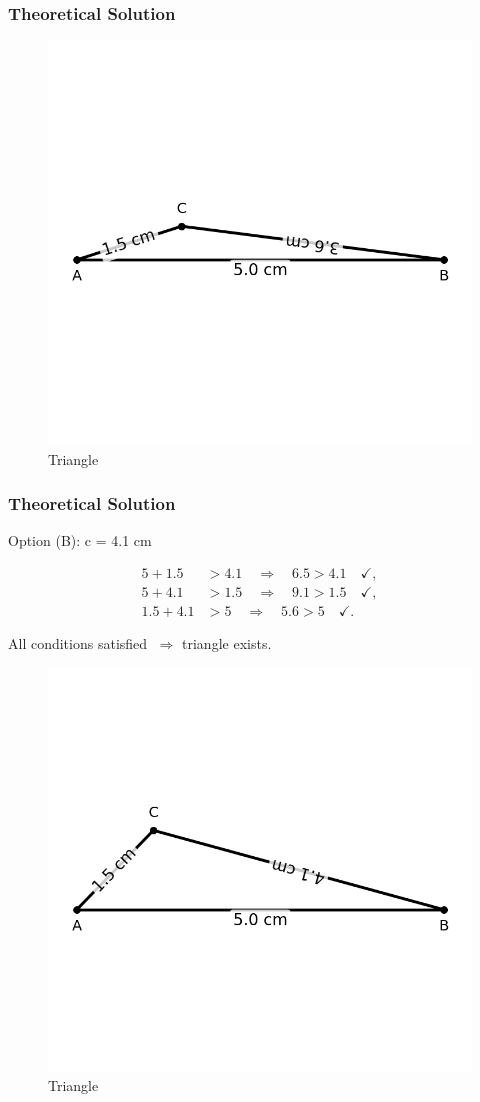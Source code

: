 \documentclass{beamer}
\begin{document}
\begin{frame}[fragile]
    \frametitle{Theoretical Solution}
\begin{figure}[htbp]
\centering
\includegraphics[width=\columnwidth]{figs/fig1.png}
\caption{Triangle}
\label{fig:figs/fig1.png}
\end{figure}
\end{frame}

\begin{frame}[fragile]
    \frametitle{Theoretical Solution}
Option (B): c = 4.1 cm

\begin{align}
5 + 1.5 &> 4.1 \quad\Rightarrow\quad 6.5 > 4.1\quad\checkmark,\\
5 + 4.1 &> 1.5 \quad\Rightarrow\quad 9.1 > 1.5\quad\checkmark,\\
1.5 + 4.1 &> 5 \quad\Rightarrow\quad 5.6 > 5\quad\checkmark.
\end{align}

All conditions satisfied $\;\Rightarrow$ triangle exists.

\begin{figure}[htbp]
\centering
\includegraphics[width=0.5\columnwidth]{figs/fig2.png}
\caption{Triangle}
\label{fig:figs/fig2.png}
\end{figure}

\bigskip

\newpage

\end{frame}
\end{document}
